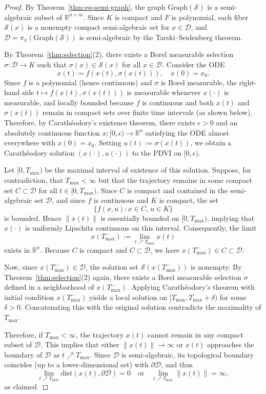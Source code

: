 \documentclass[sn-basic,Numbered]{sn-jnl}
\theoremstyle{thmstyleone}%
\begin{document}
\begin{proof}
By Theorem~\ref{thm:eq-semi-graph}, the graph $\mathrm{Graph}(\mathcal{S})$ is a semi-algebraic subset of $\mathbb{R}^{n+m}$. Since $K$ is compact and $F$ is polynomial, each fiber $\mathcal{S}(x)$ is a nonempty compact semi-algebraic set for $x \in \mathcal{D}$, and $\mathcal{D} = \pi_x(\mathrm{Graph}(\mathcal{S}))$ is semi-algebraic by the Tarski--Seidenberg theorem.

By Theorem~\ref{thm:selection}(2), there exists a Borel measurable selection $\sigma : \mathcal{D} \to K$ such that $\sigma(x) \in \mathcal{S}(x)$ for all $x \in \mathcal{D}$. Consider the ODE
\[
\dot{x}(t) = f(x(t), \sigma(x(t))), \quad x(0) = x_0.
\]
Since $f$ is a polynomial (hence continuous) and $\sigma$ is Borel measurable, the right-hand side $t \mapsto f(x(t), \sigma(x(t)))$ is measurable whenever $x(\cdot)$ is measurable, and locally bounded because $f$ is continuous and both $x(t)$ and $\sigma(x(t))$ remain in compact sets over finite time intervals (as shown below). Therefore, by Carath\'{e}odory's existence theorem, there exists $\epsilon > 0$ and an absolutely continuous function $x : [0, \epsilon) \to \mathbb{R}^n$ satisfying the ODE almost everywhere with $x(0) = x_0$. Setting $u(t) := \sigma(x(t))$, we obtain a Carath\'{e}odory solution $(x(\cdot), u(\cdot))$ to the PDVI on $[0, \epsilon)$.

Let $[0, T_{\max})$ be the maximal interval of existence of this solution. Suppose, for contradiction, that $T_{\max} < \infty$ but that the trajectory remains in some compact set $C \subset \mathcal{D}$ for all $t \in [0, T_{\max})$. Since $C$ is compact and contained in the semi-algebraic set $\mathcal{D}$, and since $f$ is continuous and $K$ is compact, the set
\[
\{ f(x, u) : x \in C,\, u \in K \}
\]
is bounded. Hence $\|\dot{x}(t)\|$ is essentially bounded on $[0, T_{\max})$, implying that $x(\cdot)$ is uniformly Lipschitz continuous on this interval. Consequently, the limit
\[
x(T_{\max}^-) := \lim_{t \nearrow T_{\max}} x(t)
\]
exists in $\mathbb{R}^n$. Because $C$ is compact and $C \subset \mathcal{D}$, we have $x(T_{\max}^-) \in C \subset \mathcal{D}$.

Now, since $x(T_{\max}^-) \in \mathcal{D}$, the solution set $\mathcal{S}(x(T_{\max}^-))$ is nonempty. By Theorem~\ref{thm:selection}(2) again, there exists a Borel measurable selection $\sigma$ defined in a neighborhood of $x(T_{\max}^-)$. Applying Carath\'{e}odory's theorem with initial condition $x(T_{\max}^-)$ yields a local solution on $[T_{\max}, T_{\max} + \delta)$ for some $\delta > 0$. Concatenating this with the original solution contradicts the maximality of $T_{\max}$.

Therefore, if $T_{\max} < \infty$, the trajectory $x(t)$ cannot remain in any compact subset of $\mathcal{D}$. This implies that either $\|x(t)\| \to \infty$ or $x(t)$ approaches the boundary of $\mathcal{D}$ as $t \nearrow T_{\max}$. Since $\mathcal{D}$ is semi-algebraic, its topological boundary coincides (up to a lower-dimensional set) with $\partial \mathcal{D}$, and thus
\[
\lim_{t \nearrow T_{\max}} \mathrm{dist}(x(t), \partial \mathcal{D}) = 0
\quad \text{or} \quad
\lim_{t \nearrow T_{\max}} \|x(t)\| = \infty,
\]
as claimed.
\end{proof}
\end{document}
